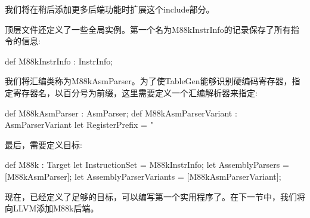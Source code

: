 我们将在稍后添加更多后端功能时扩展这个include部分。

顶层文件还定义了一些全局实例。第一个名为M88kInstrInfo的记录保存了所有指令的信息:

\begin{cpp}
def M88kInstrInfo : InstrInfo;
\end{cpp}

我们将汇编类称为M88kAsmParser。为了使TableGen能够识别硬编码寄存器，指定寄存器名，以百分号为前缀，这里需要定义一个汇编解析器来指定:

\begin{cpp}
def M88kAsmParser : AsmParser;
def M88kAsmParserVariant : AsmParserVariant {
    let RegisterPrefix = "%
}
\end{cpp}

最后，需要定义目标:

\begin{cpp}
def M88k : Target {
    let InstructionSet = M88kInstrInfo;
    let AssemblyParsers = [M88kAsmParser];
    let AssemblyParserVariants = [M88kAsmParserVariant];
}
\end{cpp}

现在，已经定义了足够的目标，可以编写第一个实用程序了。在下一节中，我们将向LLVM添加M88k后端。





